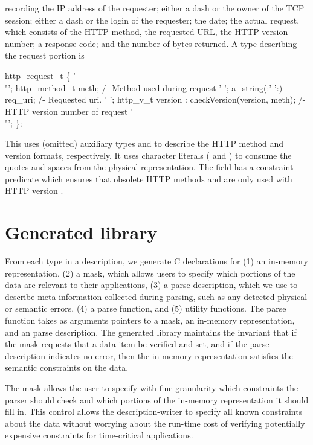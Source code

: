 \noindent
recording the IP address of the requester; either a dash or the owner
of the TCP session; either a dash or the login of the requester; the
date; the actual request, which consists of the HTTP method, the
requested URL, the HTTP version number; a response code; and the
number of bytes returned.  A \PADSL{} type describing the request
portion is
\begin{code}
 http_request_t \{
  '\\"'; http_method_t   meth;           /- Method used during request
  ' ';  a_string(:' ':) req_uri;        /- Requested uri.
  ' ';  http_v_t        version : checkVersion(version, meth);
                                        /- HTTP version number of request 
  '\\"';
\};
\end{code}
This  uses (omitted) auxiliary types  and
 to describe
the HTTP method and version formats, respectively.
It uses character literals ( and ) to consume
the quotes and 
spaces from the physical representation. 
The  field has a constraint predicate 
which ensures that obsolete HTTP methods  and  
are only used with HTTP version .

\section{Generated library}
From each type in a \PADSL{} description, we generate C declarations for
(1) an in-memory representation, 
(2) a mask, which allows users to specify which portions of the data
are relevant to their applications, 
(3) a  parse description, which we use to describe meta-information
collected during parsing, such as any detected physical or semantic errors,
(4) a parse function, and 
(5) utility functions.
The parse function takes as arguments pointers to a mask, an
in-memory representation, and an parse description.  The generated
library maintains the invariant that if the mask requests
that a data item be verified and set, and if the parse description
indicates no error, then the in-memory representation satisfies the
semantic constraints on the data.

The mask allows the user to specify with fine granularity
which constraints the parser should check and which portions of the
in-memory representation it should fill in.  This control allows the
description-writer to specify all known constraints about the data
without worrying about the run-time cost of verifying potentially
expensive constraints for time-critical applications.

